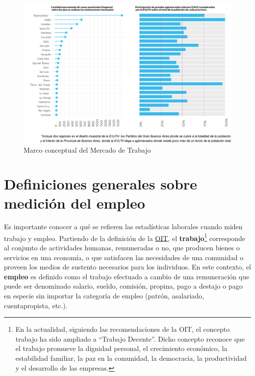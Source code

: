 \documentclass[
  openany]{book}
\begin{document}
\begin{figure}

{\centering \includegraphics[width=1\linewidth]{imagenes/figura2.1} 

}

\caption{Marco conceptual del Mercado de Trabajo}\label{fig:empleooit}
\end{figure}

\hypertarget{definiciones-generales-sobre-mediciuxf3n-del-empleo}{%
\section{Definiciones generales sobre medición del empleo}\label{definiciones-generales-sobre-mediciuxf3n-del-empleo}}

Es importante conocer a qué se refieren las estadísticas laborales cuando miden trabajo y empleo. Partiendo de la definición de la \href{https://www.ilo.org/global/lang--es/index.htm}{OIT}, el \textbf{trabajo}\footnote{En la actualidad, siguiendo las recomendaciones de la OIT, el concepto trabajo ha sido ampliado a ``Trabajo Decente''. Dicho concepto reconoce que el trabajo promueve la dignidad personal, el crecimiento económico, la estabilidad familiar, la paz en la comunidad, la democracia, la productividad y el desarrollo de las empresas.} corresponde al conjunto de actividades humanas, remuneradas o no, que producen bienes o servicios en una economía, o que satisfacen las necesidades de una comunidad o proveen los medios de sustento necesarios para los individuos. En este contexto, el \textbf{empleo} es definido como el trabajo efectuado a cambio de una remuneración que puede ser denominado salario, sueldo, comisión, propina, pago a destajo o pago en especie sin importar la categoría de empleo (patrón, asalariado, cuentapropista, etc.).
\end{document}
